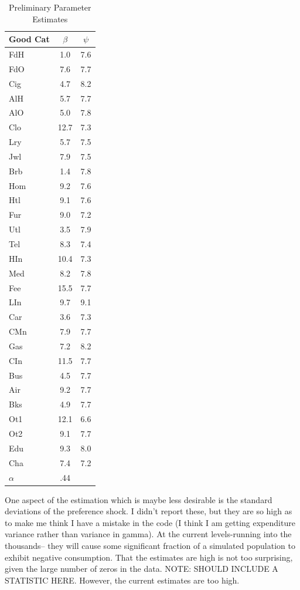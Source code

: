 \documentclass{article}
\begin{document}
\begin{table}
	\begin{center}
		\begin{tabular}{|l|c|c|}
			\hline
			Good Cat & $\beta$ & $\psi$ \\
			\hline
			FdH & 1.0 & 7.6 \\   
			\hline
			FdO & 7.6 & 7.7 \\ 
			\hline
			Cig & 4.7 & 8.2 \\ 
			\hline
			AlH & 5.7 & 7.7 \\ 
			\hline
			AlO & 5.0 & 7.8 \\ 
			\hline
			Clo & 12.7 & 7.3  \\
			\hline
			Lry & 5.7 & 7.5 \\ 
			\hline
			Jwl & 7.9 & 7.5 \\ 
			\hline
			Brb & 1.4 & 7.8 \\ 
			\hline
			Hom & 9.2 & 7.6 \\ 
			\hline
			Htl & 9.1 & 7.6 \\ 
			\hline
			Fur & 9.0 & 7.2 \\ 
			\hline
			Utl & 3.5 & 7.9 \\ 
			\hline
			Tel & 8.3 & 7.4 \\ 
			\hline
			HIn & 10.4 & 7.3 \\ 
			\hline
			Med & 8.2 & 7.8 \\ 
			\hline
			Fee & 15.5 & 7.7 \\ 
			\hline
			LIn & 9.7 & 9.1 \\ 
			\hline
			Car & 3.6 & 7.3 \\ 
			\hline
			CMn & 7.9 & 7.7 \\ 
			\hline
			Gas & 7.2 & 8.2 \\ 
			\hline
			CIn & 11.5 & 7.7 \\ 
			\hline
			Bus & 4.5 & 7.7 \\ 
			\hline
			Air & 9.2 & 7.7 \\ 
			\hline
			Bks & 4.9 & 7.7 \\ 
			\hline
			Ot1 & 12.1 & 6.6 \\ 
			\hline
			Ot2 & 9.1 & 7.7 \\ 
			\hline
			Edu & 9.3 & 8.0 \\ 
			\hline
			Cha & 7.4 & 7.2 \\ 
			\hline
			\hline
			$\alpha$ & .44 & \\
			\hline
		\end{tabular}
	\end{center}
	\caption{Preliminary Parameter Estimates}
	\label{tab:parest}
\end{table}
One aspect of the estimation which is maybe less desirable is the standard deviations of the preference shock.
I didn't report these, but they are so high as to make me think I have a mistake in the code (I think I am getting expenditure variance rather than variance in gamma).
At the current levels-running into the thousands-- they will cause some significant fraction of a simulated population to exhibit negative consumption.
That the estimates are high is not too surprising, given the large number of zeros in the data.
NOTE: SHOULD INCLUDE A STATISTIC HERE.
However, the current estimates are too high.
\end{document}
